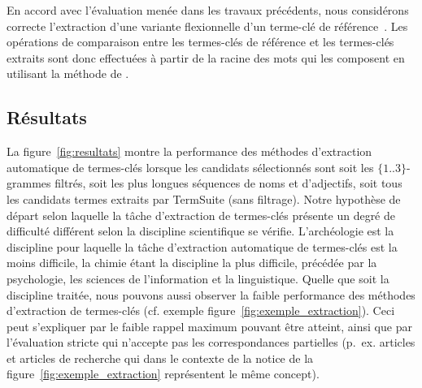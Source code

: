     En accord avec l'évaluation menée dans les travaux précédents, nous
    considérons correcte l'extraction d'une variante flexionnelle d'un terme-clé
    de référence~\cite{kim2010semeval}. Les opérations de comparaison entre les
    termes-clés de référence et les termes-clés extraits sont donc effectuées à
    partir de la racine des mots qui les composent en utilisant la méthode de
    .

  \subsection{Résultats}
  \label{subsec:resultats}
    La figure~\ref{fig:resultats} montre la performance des méthodes
    d'extraction automatique de termes-clés lorsque les candidats sélectionnés
    sont soit les $\{1..3\}$-grammes filtrés, soit les plus longues séquences de
    noms et d'adjectifs, soit tous les candidats termes extraits par TermSuite
    (sans filtrage). Notre hypothèse de départ selon laquelle la tâche
    d'extraction de termes-clés présente un degré de difficulté différent selon
    la discipline scientifique se vérifie. L'archéologie est la discipline pour
    laquelle la tâche d'extraction automatique de termes-clés est la moins
    difficile, la chimie étant la discipline la plus difficile, précédée par la
    psychologie, les sciences de l'information et la linguistique. Quelle que
    soit la discipline traitée, nous pouvons aussi observer la faible
    performance des méthodes d'extraction de termes-clés (cf. exemple
    figure~\ref{fig:exemple_extraction}). Ceci peut s'expliquer par le faible
    rappel maximum pouvant être atteint, ainsi que par l'évaluation stricte qui
    n'accepte pas les correspondances partielles (p.~ex. \og{}articles\fg{} et
    \og{}articles de recherche\fg{} qui dans le contexte de la notice de la
    figure~\ref{fig:exemple_extraction} représentent le même concept).

